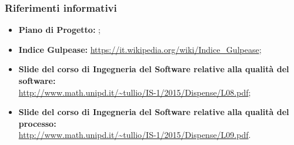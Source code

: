 \documentclass[../PianoDiQualifica.tex]{subfiles}
\begin{document}
		\subsubsection{Riferimenti informativi}
		\begin{itemize}
			\item \textbf{Piano di Progetto:} \pianodiprogettov;
			\item \textbf{Indice Gulpease:} \url{https://it.wikipedia.org/wiki/Indice\_Gulpease};
			\item \textbf{Slide del corso di Ingegneria del Software relative alla qualità del software:} \\\url{http://www.math.unipd.it/~tullio/IS-1/2015/Dispense/L08.pdf};
			\item \textbf{Slide del corso di Ingegneria del Software relative alla qualità del processo:} \\\url{http://www.math.unipd.it/~tullio/IS-1/2015/Dispense/L09.pdf}.
		\end{itemize}
\end{document}
